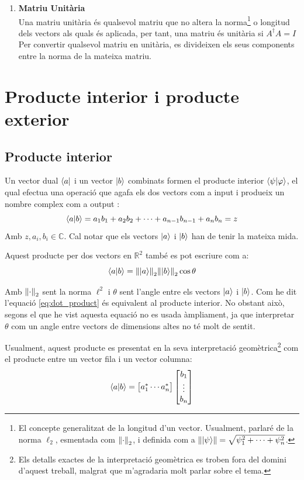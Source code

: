 \begin{enumerate}
	\item \textbf{Matriu Unitària} \\
	Una matriu unitària és qualsevol matriu que no altera la norma\footnote{El concepte generalitzat de la longitud d'un vector. Usualment, parlaré de la norma $\ell_2$, esmentada com $\norm{\cdot}_2$, i definida com a $\norm{\ket{\psi}} = \sqrt{\psi^2_1 + \cdots + \psi^2_n}$.} o longitud dels vectors als quals és aplicada, per tant, una matriu és unitària si $A^\dagger A = I$
	Per convertir qualsevol matriu en unitària, es divideixen els seus components entre la norma de la mateixa matriu.
	
\end{enumerate}

\section{Producte interior i producte exterior}

\subsection{Producte interior}
Un vector dual $\bra{a}$ i un vector $\ket{b}$ combinats formen el producte interior $\bra{\psi}\ket{\varphi}$, el qual efectua una operació que agafa els dos vectors com a input i produeix un nombre complex com a output \cite{QCandQI:inner}:
$$
\bra{a}\ket{b} = a_1 b_1 + a_2 b_2 + \cdots + a_{n-1} b_{n-1} + a_n b_n = z
$$
Amb $z, a_i, b_i \in \mathbb{C}$. Cal notar que els vectors $\ket{a}$ i $\ket{b}$ han de tenir la mateixa mida. 

Aquest producte per dos vectors en $\mathbb{R}^2$ també es pot escriure com a:
\begin{equation}
	\bra{a}\ket{b} = \norm{\ket{a}}_2  \norm{\ket{b}}_2 \cos \theta 
	\label{eq:dot_product}
\end{equation}


Amb $\norm{\cdot}_2$ sent la norma $\ell^2$ i $\theta$ sent l'angle entre els vectors $\ket{a}$ i $\ket{b}$. Com he dit l'equació \eqref{eq:dot_product} és equivalent al producte interior. No obstant això, segons el que he vist aquesta equació no es usada àmpliament, ja que interpretar $\theta$ com un angle entre vectors de dimensions altes no té molt de sentit. 

Usualment, aquest producte es presentat en la seva interpretació geomètrica\footnote{Els detalls exactes de la interpretació geomètrica es troben fora del domini d'aquest treball, malgrat que m'agradaria molt parlar sobre el tema.} com el producte entre un vector fila i un vector columna:
$$
\bra{a}\ket{b} = \begin{bmatrix}a_1^{*}  \cdots  a_n^{*} \end{bmatrix} \begin{bmatrix} b_{1} \\ \vdots \\ b_{n} \end{bmatrix}
$$

